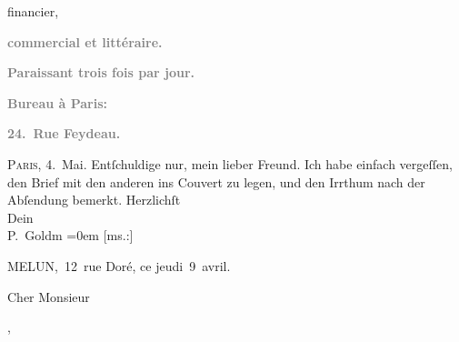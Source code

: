 \begin{ledgroupsized}[t]{13cm}
\begin{otherlanguage}{french}
{{                        financier,}}\end{otherlanguage}\pend
           \pstart
           \begin{otherlanguage}{french}\textcolor{gray}{\textbf{commercial et littéraire.}}\end{otherlanguage}\pend
           \pstart
           \begin{otherlanguage}{french}\textcolor{gray}{\textbf{\textbf{Paraissant trois fois par jour.}}}\end{otherlanguage}\pend
           \pstart
           \begin{otherlanguage}{french}\textcolor{gray}{\textbf{\textbf{Bureau à Paris:}}}\end{otherlanguage}\pend
           \pstart
           \begin{otherlanguage}{french}\textcolor{gray}{\textbf{\textbf{24. Rue Feydeau.}}}\end{otherlanguage}\hfill \textsc{Paris}, 4. Mai.\pend
           \pstart
           {\pb}Entſchuldige nur, mein lieber
                  Freund. Ich habe einfach vergeſſen, den Brief mit den anderen ins Couvert
               zu legen, und den Irrthum \label{K_L02773-1v}\label{K_L02773-1h} nach der Abſendung bemerkt.\pend
           \pstart
           Herzlichſt {\\[\baselineskip]}Dein {\\[\baselineskip]}\spacefill\mbox{P. Goldm}\pend
           \leftskip=0em{}{\bigskip}\pstart
           {\pb}{[}ms.:{]} \begin{otherlanguage}{french}MELUN, 12 rue Doré, ce jeudi 9 avril.\end{otherlanguage}\pend
           \pstart{}\begin{otherlanguage}{french}Cher Monsieur\end{otherlanguage},\pend\pstart
           \label{K_L02773-2v}
\end{ledgroupsized}

